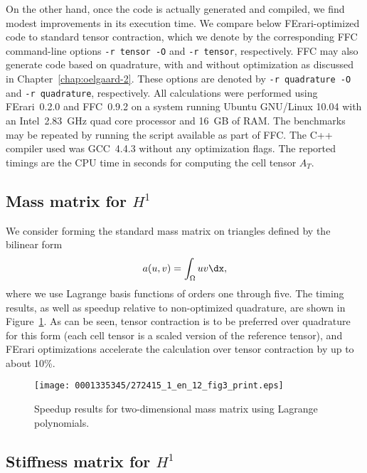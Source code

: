 On the other hand, once the code is actually generated and compiled,
we find modest improvements in its execution time. We compare below
FErari-optimized code to standard tensor contraction, which we denote
by the corresponding FFC command-line options \texttt{-r tensor -O}
and \texttt{-r tensor}, respectively. FFC may also generate code based
on quadrature, with and without optimization as discussed in
Chapter~\ref{chap:oelgaard-2}. These options are denoted by \texttt{-r
  quadrature -O} and \texttt{-r quadrature}, respectively. All
calculations were performed using FErari~0.2.0 and FFC~0.9.2 on a
system running Ubuntu GNU/Linux 10.04 with an Intel~2.83~GHz quad core
processor and 16~GB of RAM. The benchmarks may be repeated by running
the script  available as part of FFC. The C++
compiler used was GCC~4.4.3 without any optimization flags. The
reported timings are the CPU time in seconds for computing the cell
tensor $A_T$.

\subsection{Mass matrix for $H^1$}

We consider forming the standard mass matrix on triangles defined by
the bilinear form
\begin{equation} \label{eq:MassH1}
  a(u, v) = \int_{\Omega} u v \dx,
\end{equation}
where we use Lagrange basis functions of orders one through five. The
timing results, as well as speedup relative to non-optimized quadrature,
are shown in Figure~\ref{fig:MassH1}. As can be seen, tensor
contraction is to be preferred over quadrature for this form (each
cell tensor is a scaled version of the reference tensor), and FErari
optimizations accelerate the calculation over tensor contraction by up
to about 10\%.

\begin{figure}[!t]
\bwfig
  \centering
  \texttt{[image: 0001335345/272415\_1\_en\_12\_fig3\_print.eps]}
  \caption{Speedup results for two-dimensional mass matrix using Lagrange polynomials.}
  \label{fig:MassH1}\vspace*{6pt}
\end{figure}

\subsection{Stiffness matrix for $H^1$}

